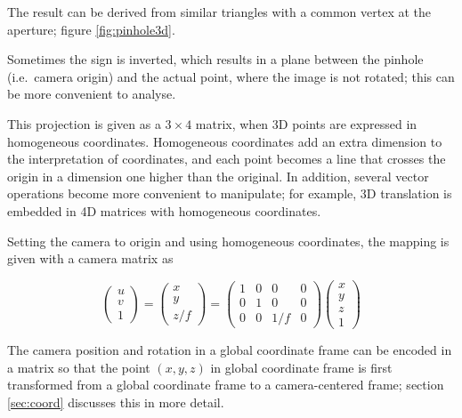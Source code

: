 The result can be derived from similar triangles with a common vertex at the aperture; figure \ref{fig:pinhole3d}.

Sometimes the sign is inverted, which results in a plane between the pinhole (i.e.~camera origin) and the actual point, where the image is not rotated; this can be more convenient to analyse.
\cite{hartley03multiview}



This projection is given as a $3 \times 4$ matrix, when 3D points are expressed in homogeneous coordinates.
Homogeneous coordinates add an extra dimension to the interpretation of coordinates, and each point becomes a line that crosses the origin in a dimension one higher than the original.
In addition, several vector operations become more convenient to manipulate; for example, 3D translation is embedded in 4D matrices with homogeneous coordinates. \cite{hartley03multiview,heyden2005multiple}

Setting the camera to origin and using homogeneous coordinates, the mapping is given with a camera matrix as

\begin{equation}
\begin{pmatrix}
u \\ v \\ 1
\end{pmatrix}
=
\begin{pmatrix}
x \\ y \\ z/f
\end{pmatrix}
=
\begin{pmatrix} \label{eq:cmat}
	1 & 0 & 0 & 0 \\
	0 & 1 & 0 & 0 \\
	0 & 0 & 1/f & 0
\end{pmatrix}
\begin{pmatrix}
x \\ y \\ z \\ 1
\end{pmatrix}
\end{equation}

The camera position and rotation in a global coordinate frame can be encoded in a matrix so that the point $(x,y,z)$ in global coordinate frame is first transformed from a global coordinate frame to a camera-centered frame; section \ref{sec:coord} discusses this in more detail.

